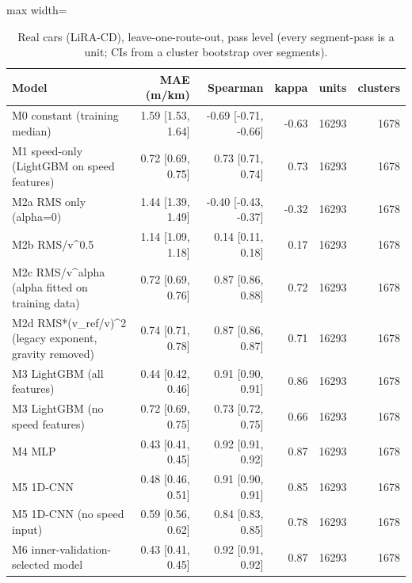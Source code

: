\begin{table}[!htbp]
\centering
\footnotesize
\caption{Real cars (LiRA-CD), leave-one-route-out, pass level (every segment-pass is a unit; CIs from a cluster bootstrap over segments).}
\label{tab:tableS_pass_level}
\begin{adjustbox}{max width=\columnwidth}
\begin{tabular}{lrrrrr}
\toprule
\textbf{Model} & \textbf{MAE (m/km)} & \textbf{Spearman} & \textbf{kappa} & \textbf{units} & \textbf{clusters} \\
\midrule
M0 constant (training median) & 1.59 [1.53, 1.64] & -0.69 [-0.71, -0.66] & -0.63 & 16293 & 1678 \\
M1 speed-only (LightGBM on speed features) & 0.72 [0.69, 0.75] & 0.73 [0.71, 0.74] & 0.73 & 16293 & 1678 \\
M2a RMS only (alpha=0) & 1.44 [1.39, 1.49] & -0.40 [-0.43, -0.37] & -0.32 & 16293 & 1678 \\
M2b RMS/v\textasciicircum{}0.5 & 1.14 [1.09, 1.18] & 0.14 [0.11, 0.18] & 0.17 & 16293 & 1678 \\
M2c RMS/v\textasciicircum{}alpha (alpha fitted on training data) & 0.72 [0.69, 0.76] & 0.87 [0.86, 0.88] & 0.72 & 16293 & 1678 \\
M2d RMS*(v\_ref/v)\textasciicircum{}2 (legacy exponent, gravity removed) & 0.74 [0.71, 0.78] & 0.87 [0.86, 0.87] & 0.71 & 16293 & 1678 \\
M3 LightGBM (all features) & 0.44 [0.42, 0.46] & 0.91 [0.90, 0.91] & 0.86 & 16293 & 1678 \\
M3 LightGBM (no speed features) & 0.72 [0.69, 0.75] & 0.73 [0.72, 0.75] & 0.66 & 16293 & 1678 \\
M4 MLP & 0.43 [0.41, 0.45] & 0.92 [0.91, 0.92] & 0.87 & 16293 & 1678 \\
M5 1D-CNN & 0.48 [0.46, 0.51] & 0.91 [0.90, 0.91] & 0.85 & 16293 & 1678 \\
M5 1D-CNN (no speed input) & 0.59 [0.56, 0.62] & 0.84 [0.83, 0.85] & 0.78 & 16293 & 1678 \\
M6 inner-validation-selected model & 0.43 [0.41, 0.45] & 0.92 [0.91, 0.92] & 0.87 & 16293 & 1678 \\
\bottomrule
\end{tabular}
\end{adjustbox}
\end{table}
